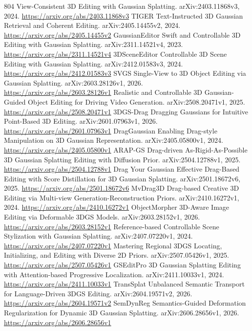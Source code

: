 \documentclass[11pt]{article}
\begin{document}
\begin{thebibliography}{804}
 View-Consistent 3D Editing with Gaussian Splatting. arXiv:2403.11868v3, 2024. \url{https://arxiv.org/abs/2403.11868v3}
 TIGER Text-Instructed 3D Gaussian Retrieval and Coherent Editing. arXiv:2405.14455v2, 2024. \url{https://arxiv.org/abs/2405.14455v2}
 GaussianEditor Swift and Controllable 3D Editing with Gaussian Splatting. arXiv:2311.14521v4, 2023. \url{https://arxiv.org/abs/2311.14521v4}
 3DSceneEditor Controllable 3D Scene Editing with Gaussian Splatting. arXiv:2412.01583v3, 2024. \url{https://arxiv.org/abs/2412.01583v3}
 SVGS Single-View to 3D Object Editing via Gaussian Splatting. arXiv:2603.28126v1, 2026. \url{https://arxiv.org/abs/2603.28126v1}
 Realistic and Controllable 3D Gaussian-Guided Object Editing for Driving Video Generation. arXiv:2508.20471v1, 2025. \url{https://arxiv.org/abs/2508.20471v1}
 3DGS-Drag Dragging Gaussians for Intuitive Point-Based 3D Editing. arXiv:2601.07963v1, 2026. \url{https://arxiv.org/abs/2601.07963v1}
 DragGaussian Enabling Drag-style Manipulation on 3D Gaussian Representation. arXiv:2405.05800v1, 2024. \url{https://arxiv.org/abs/2405.05800v1}
 ARAP-GS Drag-driven As-Rigid-As-Possible 3D Gaussian Splatting Editing with Diffusion Prior. arXiv:2504.12788v1, 2025. \url{https://arxiv.org/abs/2504.12788v1}
 Drag Your Gaussian Effective Drag-Based Editing with Score Distillation for 3D Gaussian Splatting. arXiv:2501.18672v6, 2025. \url{https://arxiv.org/abs/2501.18672v6}
 MvDrag3D Drag-based Creative 3D Editing via Multi-view Generation-Reconstruction Priors. arXiv:2410.16272v1, 2024. \url{https://arxiv.org/abs/2410.16272v1}
 ObjectMorpher 3D-Aware Image Editing via Deformable 3DGS Models. arXiv:2603.28152v1, 2026. \url{https://arxiv.org/abs/2603.28152v1}
 Reference-based Controllable Scene Stylization with Gaussian Splatting. arXiv:2407.07220v1, 2024. \url{https://arxiv.org/abs/2407.07220v1}
 Mastering Regional 3DGS Locating, Initializing, and Editing with Diverse 2D Priors. arXiv:2507.05426v1, 2025. \url{https://arxiv.org/abs/2507.05426v1}
 GSEditPro 3D Gaussian Splatting Editing with Attention-based Progressive Localization. arXiv:2411.10033v1, 2024. \url{https://arxiv.org/abs/2411.10033v1}
 TransSplat Unbalanced Semantic Transport for Language-Driven 3DGS Editing. arXiv:2604.19571v2, 2026. \url{https://arxiv.org/abs/2604.19571v2}
 SemDynReg Semantics-Guided Deformation Regularization for Dynamic 3D Gaussian Splatting. arXiv:2606.28656v1, 2026. \url{https://arxiv.org/abs/2606.28656v1}

\end{thebibliography}
\end{document}
